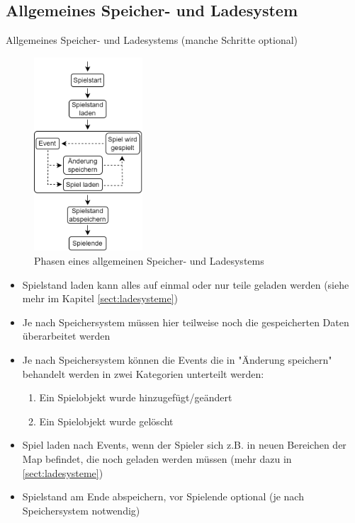 \subsection{Allgemeines Speicher- und Ladesystem}
Allgemeines Speicher- und Ladesystems (manche Schritte optional)
\begin{figure}[htp]
    \centering
    \includegraphics[width=0.36\textwidth]{images/Speichersystem.png}
    \caption{Phasen eines allgemeinen Speicher- und Ladesystems}
    \label{fig:speicherphasen}
\end{figure}

\begin{itemize}
    \item Spielstand laden kann alles auf einmal oder nur teile geladen werden (siehe mehr im Kapitel \ref{sect:ladesysteme})
    \item Je nach Speichersystem müssen hier teilweise noch die gespeicherten Daten überarbeitet werden
    \item Je nach Speichersystem können die Events die in "Änderung speichern" behandelt werden in zwei Kategorien unterteilt werden:
    \begin{enumerate}
        \item Ein Spielobjekt wurde hinzugefügt/geändert
        \item Ein Spielobjekt wurde gelöscht
    \end{enumerate}
    \item Spiel laden nach Events, wenn der Spieler sich z.B. in neuen Bereichen der Map befindet, die noch geladen werden müssen (mehr dazu in \ref{sect:ladesysteme})
    \item Spielstand am Ende abspeichern, vor Spielende optional (je nach Speichersystem notwendig)
\end{itemize}


